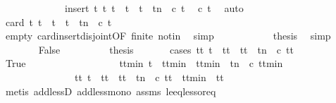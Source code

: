 \begin{isabellebody}
\ \ \ \ \ \ \ \ \ \ \ \ {\isacharequal}\ insert\ t\ {\isacharbraceleft}t{\isacharprime}{\isachardot}\ t\ {\isacharless}\ t{\isacharprime}\ {\isasymand}\ t{\isacharprime}\ {\isasymle}\ t{\isacharplus}n\ {\isasymand}\ c\ t{\isacharprime}{\isacharbraceright}{\isacartoucheclose}\ \isamarkupfalse%
\ {\isacartoucheopen}c\ t{\isacartoucheclose}\ \isamarkupfalse%
\ auto\isanewline
\ \ \ \ \ \ \ \ \isamarkupfalse%
\ {\isacartoucheopen}card\ {\isacharbraceleft}t{\isacharprime}{\isachardot}\ t\ {\isasymle}\ t{\isacharprime}\ {\isasymand}\ t{\isacharprime}\ {\isasymle}\ t{\isacharplus}n\ {\isasymand}\ c\ t{\isacharprime}{\isacharbraceright}\ {\isacharequal}\ {}{\isacartoucheclose}\isanewline
\ \ \ \ \ \ \ \ \ \ \isamarkupfalse%
\ empty\ card{\isacharunderscore}insert{\isacharunderscore}disjoint{\isacharbrackleft}OF\ finite\ notin{\isacharbrackright}\ \isamarkupfalse%
\ simp\isanewline
\ \ \ \ \ \ \ \ \isamarkupfalse%
\ \isamarkupfalse%
\ {\isacharquery}thesis\ \isamarkupfalse%
\ simp\isanewline
\ \ \ \ \isamarkupfalse%
\isanewline
\ \ \ \ \ \ \isamarkupfalse%
\ False\isanewline
\ \ \ \ \ \ \isamarkupfalse%
\ \isamarkupfalse%
\ {\isacharquery}thesis\isanewline
\ \ \ \ \ \ \isamarkupfalse%
{\isacharparenleft}cases\ {\isacartoucheopen}{\isasymexists}tt{\isachardot}\ t\ {\isacharless}\ tt\ {\isasymand}\ tt\ {\isasymle}\ t{\isacharplus}n\ {\isasymand}\ c\ tt{\isacartoucheclose}{\isacharparenright}\isanewline
\ \ \ \ \ \ \ \ \isamarkupfalse%
\ True\isanewline
\ \ \ \ \ \ \ \ \isanewline
\ \ \ \ \ \ \ \ \isamarkupfalse%
\ {\isacartoucheopen}{\isasymexists}ttmin{\isachardot}\ t\ {\isacharless}\ ttmin\ {\isasymand}\ ttmin\ {\isasymle}\ t{\isacharplus}n\ {\isasymand}\ c\ ttmin\isanewline
\ \ \ \ \ \ \ \ \ \ \ \ \ \ {\isasymand}\ {\isacharparenleft}{\isasymforall}tt{\isacharprime}{\isachardot}\ {\isacharparenleft}t\ {\isacharless}\ tt{\isacharprime}\ {\isasymand}\ tt{\isacharprime}\ {\isasymle}\ t{\isacharplus}n\ {\isasymand}\ c\ tt{\isacharprime}{\isacharparenright}\ {\isasymlongrightarrow}\ ttmin\ {\isasymle}\ tt{\isacharprime}{\isacharparenright}{\isacartoucheclose}\isanewline
\ \ \ \ \ \ \ \ \ \ \isamarkupfalse%
\ {\isacharparenleft}metis\ add{\isacharunderscore}lessD{}\ add{\isacharunderscore}less{\isacharunderscore}mono{}\ assms\ le{\isacharunderscore}eq{\isacharunderscore}less{\isacharunderscore}or{\isacharunderscore}eq\isanewline

\end{isabellebody}
